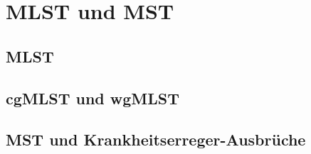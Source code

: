 \section{MLST und MST}

\subsection{MLST}

\subsection{cgMLST und wgMLST}

\subsection{MST und Krankheitserreger-Ausbrüche}
